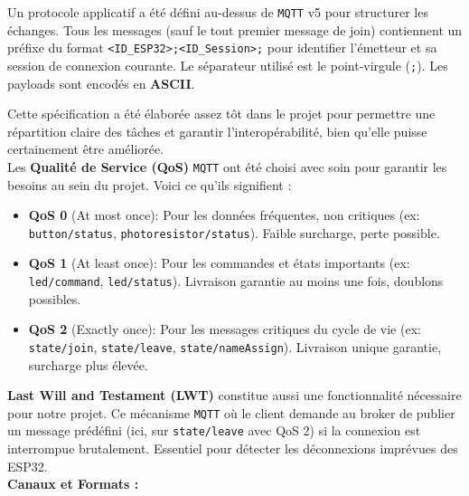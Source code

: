 \documentclass[12pt]{article}
\begin{document}
Un protocole applicatif a été défini au-dessus de \texttt{MQTT} v5 pour structurer les échanges. Tous les messages (sauf le tout premier message de join) contiennent un préfixe du format \texttt{<ID\_ESP32>;<ID\_Session>;} pour identifier l'émetteur et sa session de connexion courante. Le séparateur utilisé est le point-virgule (\texttt{;}). Les payloads sont encodés en \textbf{ASCII}.

Cette spécification a été élaborée assez tôt dans le projet pour permettre une répartition claire des tâches et garantir l'interopérabilité, bien qu'elle puisse certainement être améliorée. \\

Les \textbf{Qualité de Service (QoS)} \texttt{MQTT} ont été choisi avec soin pour garantir les besoins au sein du
projet. Voici ce qu'ils signifient :
\begin{itemize}
    \item \textbf{QoS 0} (At most once): Pour les données fréquentes, non critiques (ex: \texttt{button/status}, \texttt{photoresistor/status}). Faible surcharge, perte possible.
    \item \textbf{QoS 1} (At least once): Pour les commandes et états importants (ex: \texttt{led/command}, \texttt{led/status}). Livraison garantie au moins une fois, doublons possibles.
    \item \textbf{QoS 2} (Exactly once): Pour les messages critiques du cycle de vie (ex: \texttt{state/join}, \texttt{state/leave}, \texttt{state/nameAssign}). Livraison unique garantie, surcharge plus élevée.
\end{itemize} \hfill \break

\textbf{Last Will and Testament (LWT)} constitue aussi une fonctionnalité nécessaire pour notre projet. Ce mécanisme \texttt{MQTT} où le client demande au broker de publier un message prédéfini (ici, sur \texttt{state/leave} avec QoS 2) si la connexion est interrompue brutalement. Essentiel pour détecter les déconnexions imprévues des ESP32. \\

\textbf{Canaux et Formats :}
\end{document}
